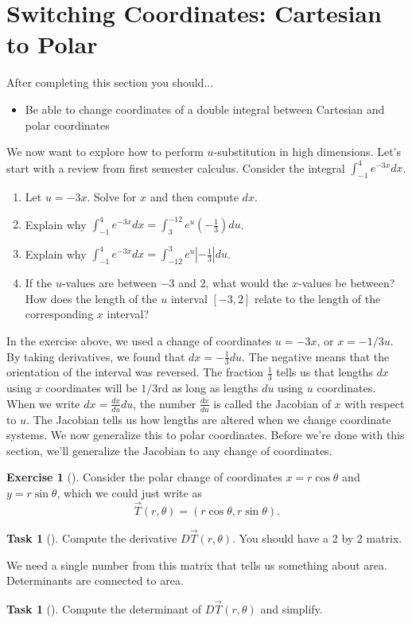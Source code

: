 \documentclass[10pt,]{book}
\theoremstyle{plain}
\theoremstyle{definition}
\theoremstyle{definition}
\theoremstyle{definition}
\theoremstyle{definition}
\newtheorem{exploration}[project]{Exercise}
\newtheorem{task}[project]{Task}
\theoremstyle{definition}
\numberwithin{equation}{section}
\newcommand{\ds}{\displaystyle}
\begin{document}
\section[{Switching Coordinates: Cartesian to Polar}]{Switching Coordinates: Cartesian to Polar}\label{section-39}
After completing this section you should... \leavevmode%
\begin{itemize}[label=\textbullet]
\item{}Be able to change coordinates of a double integral between Cartesian and polar coordinates%
\end{itemize}
%
\par
We now want to explore how to perform \(u\)-substitution in high dimensions. Let's start with a review from first semester calculus.%
Consider the integral \(\ds\int_{-1}^4 e^{-3x} dx\). \leavevmode%
\begin{enumerate}
\item\hypertarget{li-184}{}Let \(u=-3x\).  Solve for \(x\) and then compute \(dx\).%
\item\hypertarget{li-185}{}Explain why \(\ds\int_{-1}^4 e^{-3x} dx=\int_{3}^{-12}e^u \left(-\frac{1}{3}\right)du\).%
\item\hypertarget{li-186}{}Explain why \(\ds\int_{-1}^4 e^{-3x} dx=\int_{-12}^{3}e^u \left|-\frac{1}{3}\right| du\).%
\item\hypertarget{li-187}{}If the \(u\)-values are between \(-3\) and \(2\), what would the \(x\)-values be between? How does the  length of the \(u\) interval \([-3,2]\) relate to the length of the corresponding \(x\) interval?%
\end{enumerate}
%
In the exercise above, we used a change of coordinates \(u=-3x\), or \(x=-1/3 u\). By taking derivatives, we found that \(dx=-\frac{1}{3}du\). The negative means that the orientation of the interval was reversed. The fraction \(\frac13\) tells us that lengths \(dx\) using \(x\) coordinates will be \(1/3\)rd as long as lengths \(du\) using \(u\) coordinates. When we write \(dx = \frac{dx}{du}du\), the number \(\frac{dx}{du}\) is called the Jacobian of \(x\) with respect to \(u\). The Jacobian tells us how lengths are altered when we change coordinate systems. We now generalize this to polar coordinates. Before we're done with this section, we'll generalize the Jacobian to any change of coordinates.%
\begin{exploration}[]\label{exploration-263}
Consider the polar change of coordinates \(x=r\cos\theta\) and \(y=r\sin\theta\), which we could just write as%
\begin{equation*}
\vec T(r,\theta)=(r\cos\theta,r\sin\theta).
\end{equation*}
%
\par
%
\begin{task}[]\label{task-714}
Compute the derivative \(D\vec T(r,\theta)\).  You should have a 2 by 2 matrix.%
\end{task}
We need a single number from this matrix that tells us something about area. Determinants are connected to area.%
\begin{task}[]\label{task-715}
Compute the determinant of \(D\vec T(r,\theta)\) and simplify.%
\end{task}
\end{exploration}
\end{document}
